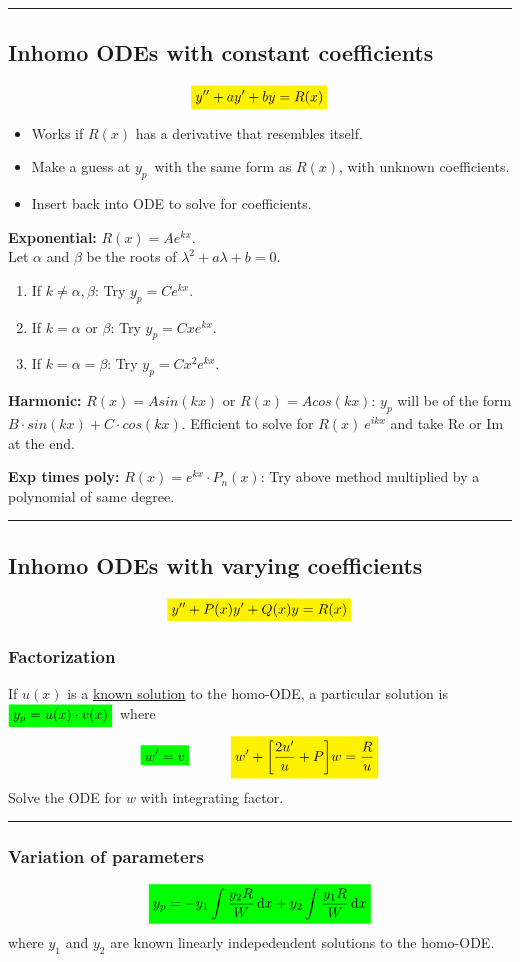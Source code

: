 \documentclass[10pt,a4paper]{article}
\renewcommand{\exp}{e^}
\newcommand{\holine}[1][\medskipamount]{\par\vspace*{\dimexpr-\parskip-\baselineskip+#1}\noindent\rule{\linewidth}{1pt}\par\vspace*{\dimexpr-\parskip-.5\baselineskip+#1}}
\newcommand{\yl}[1]{\colorbox{yellow}{$\displaystyle #1$}}
\newcommand{\gr}[1]{\colorbox{green}{$\displaystyle #1$}}
\begin{document}
\begin{multicols}{2}
\holine
\subsection*{Inhomo ODEs with constant coefficients}
\[\yl{
    y'' + ay' + by = R(x)
}\]
\begin{itemize}
    \item Works if $R(x)$ has a derivative that resembles itself.
    \item Make a guess at $y_p$ with the same form as $R(x)$, with unknown coefficients.
    \item Insert back into ODE to solve for coefficients.
\end{itemize}
\textbf{Exponential:} $R(x) = A\exp{kx}$.\\
Let $\alpha$ and $\beta $ be the roots of $\lambda^2 + a\lambda + b = 0$.
\begin{enumerate}
    \item If $k\neq \alpha,\beta$: Try $y_p = C\exp{k x}$.
    \item If $k = \alpha \text{ or } \beta$: Try $y_p = Cx\exp{k x}$.
    \item If $k = \alpha = \beta$: Try $y_p = Cx^2\exp{k x}$.
\end{enumerate}

\textbf{Harmonic:} $R(x)=Asin(kx)$ or $R(x)=Acos(kx)$:
$y_{p}$ will be of the form $B\cdot sin(kx) + C\cdot cos(kx)$. Efficient to solve for $R(x)~e^{ikx}$ and take Re or Im at the end.

\textbf{Exp times poly:} $R(x)=e^{kx}\cdot P_{n}(x)$:
Try above method multiplied by a polynomial of same degree.

\holine
\subsection*{Inhomo ODEs with varying coefficients}
\[\yl{
    y'' + P(x)y' + Q(x)y = R(x)
}\]

\subsubsection*{Factorization}
If $u(x)$ is a \underline{known solution} to the homo-ODE, a particular solution is $\gr{y_p = u(x)\cdot v(x)}$ where
\[
    \gr{w' = v} \quad\quad\quad \yl{w' + \qty[\frac{2u'}{u} + P]w = \frac{R}{u}}
\]
Solve the ODE for $w$ with integrating factor.




\holine
\subsubsection*{Variation of parameters}
\[\gr{
    y_p = -y_1\int\frac{y_2R}{W}\dd{x} + y_2 \int\frac{y_1R}{W}\dd{x}
}\]
where $y_1$ and $y_2$ are known linearly indepedendent solutions to the homo-ODE.


\end{multicols}
\end{document}

